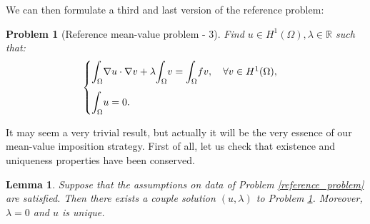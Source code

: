 \documentclass[a4paper,11pt]{article}
\newtheorem{problem}{Problem}
\newtheorem{lemma}{Lemma}
\begin{document}
\noindent We can then formulate a third and last version of the reference problem:
\begin{problem}[Reference mean-value problem - 3]\label{reference_problem_3} Find $ u \in H^1(\Omega), \lambda \in \mathbb{R}$ such that:
	\begin{equation*}
	\begin{cases}
	\mathlarger{\int}_{\Omega}\nabla u \cdot \nabla v + \lambda \mathlarger{\int}_\Omega v = \mathlarger{\int}_{\Omega} fv, \quad \forall v \in H^1(\Omega), \\[3ex]
	\mathlarger{\int}_{\Omega}u= 0.
	\end{cases}
	\end{equation*}
\end{problem}

\noindent It may seem a very trivial result, but actually it will be the very essence of our mean-value imposition strategy. First of all, let us check that existence and uniqueness properties have been conserved. \\
\begin{lemma} \label{lemma_lagrange}
	Suppose that the assumptions on data of Problem \ref{reference_problem} are satisfied. Then there exists a couple solution $(u,\lambda)$ to Problem \ref{reference_problem_3}. Moreover, $\lambda=0$ and $u$ is unique. 
\end{lemma}
\end{document}
